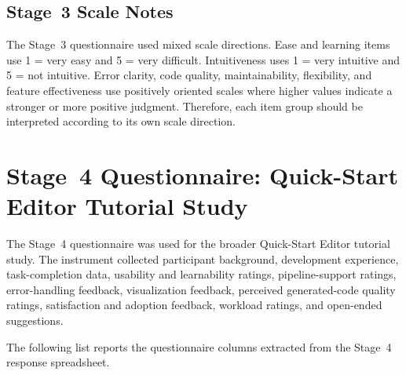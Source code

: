 \subsection{Stage~3 Scale Notes}
\label{app:stage3_scale_notes}

The Stage~3 questionnaire used mixed scale directions. Ease and learning items use 1 = very easy and 5 = very difficult. Intuitiveness uses 1 = very intuitive and 5 = not intuitive. Error clarity, code quality, maintainability, flexibility, and feature effectiveness use positively oriented scales where higher values indicate a stronger or more positive judgment. Therefore, each item group should be interpreted according to its own scale direction.

\section{Stage~4 Questionnaire: Quick-Start Editor Tutorial Study}
\label{app:stage4_questionnaire}

The Stage~4 questionnaire was used for the broader Quick-Start Editor tutorial study. The instrument collected participant background, development experience, task-completion data, usability and learnability ratings, pipeline-support ratings, error-handling feedback, visualization feedback, perceived generated-code quality ratings, satisfaction and adoption feedback, workload ratings, and open-ended suggestions.

The following list reports the questionnaire columns extracted from the Stage~4 response spreadsheet.

